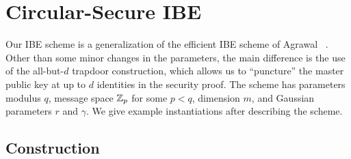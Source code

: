 \section{Circular-Secure IBE}
\label{sec:Construction}

Our IBE scheme is a generalization of the efficient IBE scheme of
Agrawal \etal~\cite{DBLP:conf/eurocrypt/AgrawalBB10}.  Other than some
minor changes in the parameters, the main difference is the use of the
all-but-$d$ trapdoor construction, which allows us to ``puncture'' the
master public key at up to $d$ identities in the security proof.  The
scheme has parameters modulus $q$, message space $\mathbb{Z}_p$ for some $p <
q$, dimension $m$, and Gaussian parameters $r$ and $\gamma$.  We give
example instantiations after describing the scheme.

\subsection{Construction}


